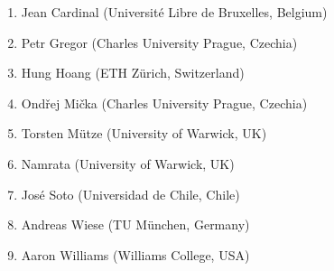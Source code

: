 
\begin{enumerate}
  \item Jean Cardinal (Université Libre de Bruxelles, Belgium)
  \item Petr Gregor (Charles University Prague, Czechia)
  \item Hung Hoang (ETH Zürich, Switzerland)
  \item Ondřej Mička (Charles University Prague, Czechia)
  \item Torsten Mütze (University of Warwick, UK)
  \item Namrata (University of Warwick, UK)
  \item José Soto (Universidad de Chile, Chile)
  \item Andreas Wiese (TU München, Germany)
  \item Aaron Williams (Williams College, USA)
\end{enumerate}
  
  